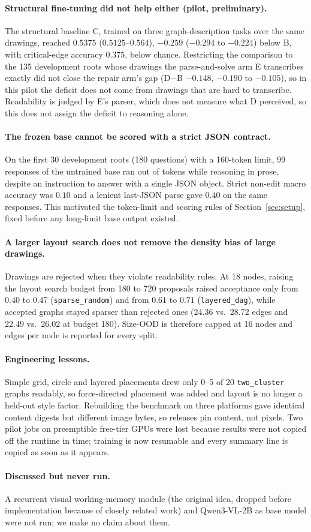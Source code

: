 \paragraph{Structural fine-tuning did not help either (pilot, preliminary).}
The structural baseline C, trained on three graph-description tasks over the same drawings,
reached $0.5375$ ($0.5125$--$0.564$), $-0.259$ ($-0.294$ to $-0.224$) below B, with critical-edge
accuracy $0.375$, below chance. Restricting the comparison to the 135 development roots whose
drawings the parse-and-solve arm E transcribes exactly did not close the repair arm's gap
(D$-$B $-0.148$, $-0.190$ to $-0.105$), so in this pilot the deficit does not come from drawings
that are hard to transcribe. Readability is judged by E's parser, which does not measure what D
perceived, so this does not assign the deficit to reasoning alone.

\paragraph{The frozen base cannot be scored with a strict JSON contract.}
On the first 30 development roots (180 questions) with a 160-token limit, 99 responses of the
untrained base ran out of tokens while reasoning in prose, despite an instruction to answer with
a single JSON object. Strict non-edit macro accuracy was $0.10$ and a lenient last-JSON parse
gave $0.40$ on the same responses. This motivated the token-limit and scoring rules of
Section~\ref{sec:setup}, fixed before any long-limit base output existed.

\paragraph{A larger layout search does not remove the density bias of large drawings.}
Drawings are rejected when they violate readability rules. At 18 nodes, raising the layout
search budget from 180 to 720 proposals raised acceptance only from $0.40$ to $0.47$
(\texttt{sparse\_random}) and from $0.61$ to $0.71$ (\texttt{layered\_dag}), while accepted graphs
stayed sparser than rejected ones (24.36 vs.\ 28.72 edges and 22.49 vs.\ 26.02 at budget 180).
Size-OOD is therefore capped at 16 nodes and edges per node is reported for every split.

\paragraph{Engineering lessons.}
Simple grid, circle and layered placements drew only 0--5 of 20 \texttt{two\_\allowbreak cluster} graphs
readably, so force-directed placement was added and layout is no longer a held-out style factor.
Rebuilding the benchmark on three platforms gave identical content digests but different image
bytes, so releases pin content, not pixels. Two pilot jobs on preemptible free-tier GPUs were lost
because results were not copied off the runtime in time; training is now resumable and every
summary line is copied as soon as it appears.

\paragraph{Discussed but never run.}
A recurrent visual working-memory module (the original idea, dropped before implementation
because of closely related work) and Qwen3-VL-2B as base model were not run; we make no claim
about them.
